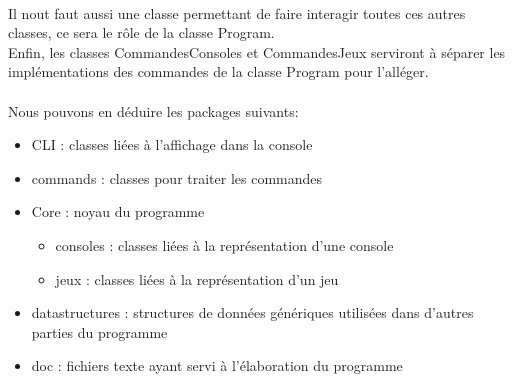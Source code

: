 \documentclass[11pt]{article}
\begin{document}
    \\
    Il nout faut aussi une classe permettant de faire interagir toutes ces autres classes, ce sera le rôle de la classe Program.
    \\
    Enfin, les classes CommandesConsoles et CommandesJeux serviront à séparer les implémentations des commandes de la classe Program pour l'alléger.
    \\\\
    Nous pouvons en déduire les packages suivants:
    \begin{itemize}
        \item CLI : classes liées à l'affichage dans la console
        \item commands : classes pour traiter les commandes
        \item Core : noyau du programme
        \begin{itemize}
            \item consoles : classes liées à la représentation d'une console
            \item jeux : classes liées à la représentation d'un jeu
        \end{itemize}
        \item datastructures : structures de données génériques utilisées dans d'autres parties du programme
        \item doc : fichiers texte ayant servi à l'élaboration du programme
    \end{itemize}
    
\end{document}
